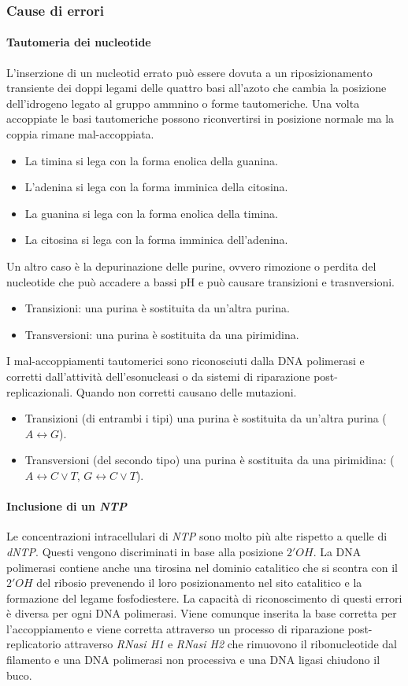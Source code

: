 \subsubsection{Cause di errori}
\paragraph{Tautomeria dei nucleotide}
L'inserzione di un nucleotid errato pu\`o essere dovuta a un riposizionamento transiente dei doppi legami delle quattro basi all'azoto che cambia la posizione dell'idrogeno legato 
al gruppo ammnino o forme tautomeriche. Una volta accoppiate le basi tautomeriche possono riconvertirsi in posizione normale ma la coppia rimane mal-accoppiata. 
\begin{itemize}
	\item La timina si lega con la forma enolica della guanina.
	\item L'adenina si lega con la forma imminica della citosina.
	\item La guanina si lega con la forma enolica della timina.
	\item La citosina si lega con la forma imminica dell'adenina. 
\end{itemize}
Un altro caso \`e la depurinazione delle purine, ovvero rimozione o perdita del nucleotide che pu\`o accadere a bassi pH e pu\`o causare transizioni e trasnversioni. 
\begin{itemize}
	\item Transizioni: una purina \`e sostituita da un'altra purina.
	\item Transversioni: una purina \`e sostituita da una pirimidina.
\end{itemize}
I mal-accoppiamenti tautomerici sono riconosciuti dalla DNA polimerasi e corretti dall'attivit\`a dell'esonucleasi o da sistemi di riparazione post-replicazionali. Quando non
corretti causano delle mutazioni.
\begin{itemize}
	\item Transizioni (di entrambi i tipi) una purina \`e sostituita da un'altra purina ($A\leftrightarrow G$).
	\item Transversioni (del secondo tipo) una purina \`e sostituita da una pirimidina: ($A\leftrightarrow C\lor T$, $G\leftrightarrow C\lor T$).
\end{itemize}
\paragraph{Inclusione di un \emph{NTP}}
Le concentrazioni intracellulari di \emph{NTP} sono molto pi\`u alte rispetto a quelle di \emph{dNTP}. Questi vengono discriminati in base alla posizione $2'OH$. La DNA polimerasi 
contiene anche una tirosina nel dominio catalitico che si scontra con il $2'OH$ del ribosio prevenendo il loro posizionamento nel sito catalitico e la formazione del legame fosfodiestere.
La capacit\`a di riconoscimento di questi errori \`e diversa per ogni DNA polimerasi. Viene comunque inserita la base corretta per l'accoppiamento e viene corretta attraverso un processo
di riparazione post-replicatorio attraverso \emph{RNasi H1} e \emph{RNasi H2} che rimuovono il ribonucleotide dal filamento e una DNA polimerasi non processiva e una DNA ligasi 
chiudono il buco. 
